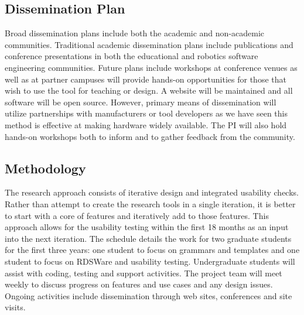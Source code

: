 \subsection{Dissemination Plan}
Broad dissemination plans include both the academic and non-academic communities.  Traditional academic dissemination plans include publications and conference presentations in both the educational and robotics software engineering communities.  Future plans include workshops at conference venues as well as at partner campuses will provide hands-on opportunities for those that wish to use the tool for teaching or design.  A website will be maintained and all software will be open source.  However, primary means of dissemination will utilize partnerships with manufacturers or tool developers as we have seen this method is effective at making hardware widely available.  The PI will also hold hands-on workshops both to inform and to gather feedback from the community.  

\subsection{Methodology}
The research approach consists of iterative design and integrated usability checks.  Rather than attempt to create the research tools in a single iteration, it is better to start with a core of features and iteratively add to those features. This approach allows for the usability testing within the first 18 months as an input into the next iteration.  The schedule details the work for two graduate students for the first three years: one student to focus on grammars and templates and one student to focus on RDSWare and usability testing.  Undergraduate students will assist with coding, testing and support activities.  The project team will meet weekly to discuss progress on features and use cases and any design issues.  Ongoing activities include dissemination through web sites, conferences and site visits.  